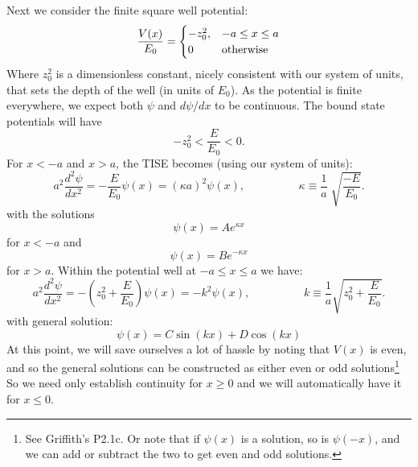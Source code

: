 \documentclass[12pt]{book}
\begin{document}
Next we consider the finite square well potential:
$$\frac{V(x)}{E_0} = \begin{cases}
-z_0^2, & -a \leq x \leq a \\
0     & {\rm otherwise} \\
\end{cases}
$$
Where $z_0^2$ is a dimensionless constant, nicely consistent with our system of units, that sets the depth of the well (in units of $E_0$). As the potential is finite everywhere, we expect both $\psi$ and $d\psi/dx$ to be continuous.
The bound state potentials will have 
$$-z_0^2 < \frac{E}{E_0} < 0.$$
For $x < -a$ and $x > a$, the TISE becomes (using our system of units):
\begin{equation*}
a^2 \frac{d^2 \psi}{d x^2} = -\frac{E}{E_0}\psi(x) = 
(\kappa a)^2 \psi(x), \hspace{2cm} \kappa \equiv \frac{1}{a} \; \sqrt{\frac{-E}{E_0}}.
\end{equation*}
with the solutions
$$\psi(x) = A e^{\displaystyle \kappa x}$$
for $x<-a$ and
$$\psi(x) = B e^{\displaystyle -\kappa x}$$
for $x>a$.  Within the potential well at $-a \leq x \leq a$ we have:
\begin{equation*}
a^2 \frac{d^2 \psi}{d x^2} = -\left(z_0^2+\frac{E}{E_0}\right)\psi(x) = -k^2 \psi(x), \hspace{2cm} k \equiv \frac{1}{a}\sqrt{z_0^2+\frac{E}{E_0}}.
\end{equation*}
with general solution:
$$\psi(x) = C \sin(kx) + D \cos(kx)$$
At this point, we will save ourselves a lot of hassle by noting that $V(x)$ is even, and so the general solutions can be constructed as either even or odd solutions\footnote{See Griffith's P2.1c.  Or note that if $\psi(x)$ is a solution, so is $\psi(-x)$, and we can add or subtract the two to get even and odd solutions.}  So we need only establish continuity for $x \geq 0$ and we will automatically have it for $x \leq 0$.
\end{document}

